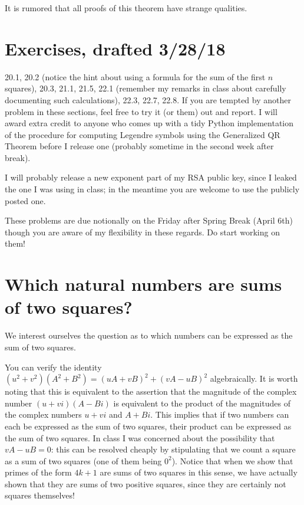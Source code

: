 \documentclass[12pt]{article}
\begin{document}
It is rumored that all proofs of this theorem have strange qualities.

\section{Exercises, drafted 3/28/18}

20.1, 20.2 (notice the hint about using a formula for the sum of the first $n$ squares), 20.3, 21.1, 21.5, 22.1 (remember my remarks in class about carefully documenting such calculations), 22.3, 22.7, 22.8.   If you are tempted by another problem in these sections, feel free to try it (or them) out and report.  I will award extra credit to anyone who comes up with a tidy Python implementation of the procedure for computing Legendre symbols using the Generalized QR Theorem before I release one (probably sometime in the second week after break).

I will probably release a new exponent part of my RSA public key, since I leaked the one I was using in class;  in the meantime you are welcome to use the publicly posted one.

These problems are due notionally on the Friday after Spring Break (April 6th) though you are aware of my flexibility in these regards.  Do start working on them!

\section{Which natural numbers are sums of two squares?}

We interest ourselves the question as to which numbers can be expressed as the sum of two squares.

You can verify the identity $(u^2+v^2)(A^2+B^2)=(uA+vB)^2+(vA-uB)^2$ algebraically.   It is worth noting that this is equivalent to the assertion that the magnitude of the complex number $(u+vi)(A-Bi)$ is equivalent to the product
of the magnitudes of the complex numbers $u+vi$ and $A+Bi$.   This implies that if two numbers can each be expressed as the sum of two squares, their product can be expressed as the sum of two squares.  In class I was concerned about the possibility that $vA-uB=0$:  this can be resolved cheaply by stipulating that we count a square as a sum of two squares (one of them being $0^2$).  Notice that when we show that primes of the form $4k+1$ are sums of two squares in this sense, we have actually shown that they are sums of two positive squares, since they are certainly not squares themselves!
\end{document}
